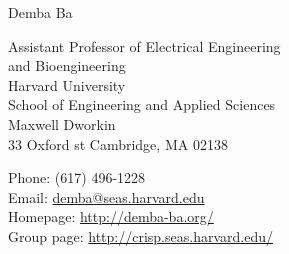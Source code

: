 \documentclass[12pt]{article}
\makeatletter
\let\saved@bibitem\@bibitem %
\def\HCode#1{}
\def\name{Demba Ba}
\makeatother
\begin{document}
\sloppy

\begingroup
\makeatletter
\let\@bibitem\saved@bibitem %
\endgroup

\HCode{<div class="fluid-container"}

\HCode{<div class="row">}
\HCode{<div class="col-md-12">}
\HCode{<h1>}
{\huge \name}
\HCode{</h1>}
\HCode{</div>} %
\HCode{</div>} %

\bigskip

\HCode{<div class="row">}
\HCode{<div class="col-md-4">}
\begin{minipage}[t]{0.5\textwidth}
  Assistant Professor of Electrical Engineering \\
  and Bioengineering \\
  Harvard University \\
  School of Engineering and Applied Sciences \\
  Maxwell Dworkin \\
  33 Oxford st
  Cambridge, MA 02138 \\
\end{minipage}
\HCode{</div>} %
\HCode{<div class="col-md-8">}
\begin{minipage}[t]{0.5\textwidth}
  Phone: (617) 496-1228 \\
  Email: \href{mailto:demba@seas.harvard.edu}{demba@seas.harvard.edu} \\
  Homepage: \href{http://demba-ba.org/}{http://demba-ba.org/} \\
  Group page: \href{http://crisp.seas.harvard.edu}{http://crisp.seas.harvard.edu/}
\end{minipage}
\HCode{</div>} %
\HCode{</div>} %
\end{document}
